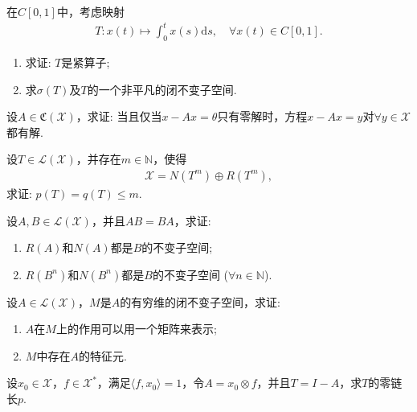 \documentclass[../../main.tex]{subfiles}%
\begin{document}
\begin{example}
在$C[0,1]$中，考虑映射
\begin{align*}
T:x(t)\mapsto \int_{0}^{t}x(s)\mathrm{d}s,\quad \forall x(t)\in C[0,1].
\end{align*}
\begin{enumerate}[(1)]
\item 求证: $T$是紧算子;
\item 求$\sigma(T)$及$T$的一个非平凡的闭不变子空间.
\end{enumerate}
\end{example}

\begin{example}
设$A\in \mathfrak{C}(\mathscr{X})$，求证: 当且仅当$x-Ax=\theta$只有零解时，方程$x-Ax=y$对$\forall y\in \mathscr{X}$都有解.
\end{example}

\begin{example}
设$T\in \mathscr{L}(\mathscr{X})$，并存在$m\in \mathbb{N}$，使得
\begin{align*}
\mathscr{X}=N(T^m)\oplus R(T^m),
\end{align*}
求证: $p(T)=q(T)\leqslant m$.
\end{example}

\begin{example}
设$A,B\in \mathscr{L}(\mathscr{X})$，并且$AB=BA$，求证:
\begin{enumerate}[(1)]
\item $R(A)$和$N(A)$都是$B$的不变子空间;
\item $R(B^n)$和$N(B^n)$都是$B$的不变子空间 ($\forall n\in \mathbb{N}$).
\end{enumerate}
\end{example}

\begin{example}
设$A\in \mathscr{L}(\mathscr{X})$，$M$是$A$的有穷维的闭不变子空间，求证:
\begin{enumerate}[(1)]
\item $A$在$M$上的作用可以用一个矩阵来表示;
\item $M$中存在$A$的特征元.
\end{enumerate}
\end{example}

\begin{example}
设$x_0\in \mathscr{X}$，$f\in \mathscr{X}^*$，满足$\langle f,x_0\rangle=1$，令$A=x_0\otimes f$，并且$T=I-A$，求$T$的零链长$p$.
\end{example}
\end{document}
